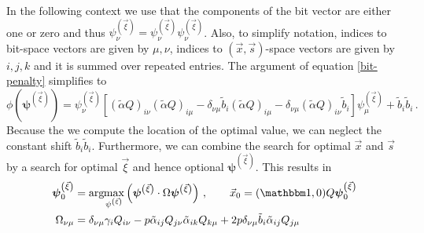 \documentclass[]{article}
\newcommand{\argmax}[1]{\text{arg}\hspace{-2pt}\max\limits_{#1}}
\newcommand{\bvec}[1]{\boldsymbol{#1}}
\begin{document}
In the following context we use that the components of the bit vector are either one or zero and thus $\psi^{\left( \vec \xi \right)}_\nu = \psi^{\left( \vec \xi \right)}_\nu \psi^{\left( \vec \xi \right)}_\nu$.
Also, to simplify notation, indices to bit-space vectors are given by $\mu, \nu$, indices to $(\vec x, \vec s)$-space vectors are given by $i, j, k$ and it is summed over repeated entries.
The argument of equation \eqref{bit-penalty} simplifies to
\begin{equation}
	\phi\left(\bvec \psi^{\left( \vec \xi \right)}\right)
	=
	\psi^{\left( \vec \xi \right)}_\nu
	\left[
		(\tilde \alpha Q)_{i\nu} (\tilde \alpha Q)_{i\mu}
		-  \delta_{\nu\mu}\tilde{b}_i (\tilde \alpha Q)_{i\mu}
		- \delta_{\nu\mu} (\tilde \alpha Q)_{i\nu} \tilde{b}_i
	\right]
	\psi^{\left( \vec \xi \right)}_\mu
	+ \tilde{b}_i \tilde{b}_i \, .
\end{equation}
Because the we compute the location of the optimal value, we can neglect the constant shift $\tilde{b}_i \tilde{b}_i$.
Furthermore, we can combine the search for optimal $\vec x$ and $\vec s$ by a search for optimal $\vec \xi$ and hence optional $\bvec \psi^{\left( \vec \xi \right)}$.
This results in
\begin{align}
	\bvec \psi^{\left( \vec \xi \right)}_{0} 
	&=
	\argmax{\psi^{\left( \vec \xi \right)}}\left( 
		\bvec \psi^{\left( \vec \xi \right)} \cdot \Omega \bvec \psi^{\left( \vec \xi \right)}
	\right)
	\, , \qquad
	\vec x_0 =  (\mathbbm 1, 0) Q \bvec \psi^{\left( \vec \xi \right)}_{0} 
	\\
	\Omega_{\nu\mu}
	&=
	\delta_{\nu\mu} \gamma_i Q_{i\nu}
	- p \tilde \alpha_{ij} Q_{j\nu} \tilde \alpha_{ik} Q_{k\mu}
	+ 2 p \delta_{\nu\mu}\tilde{b}_i \tilde \alpha_{ij} Q_{j\mu}
\end{align}
\end{document}
